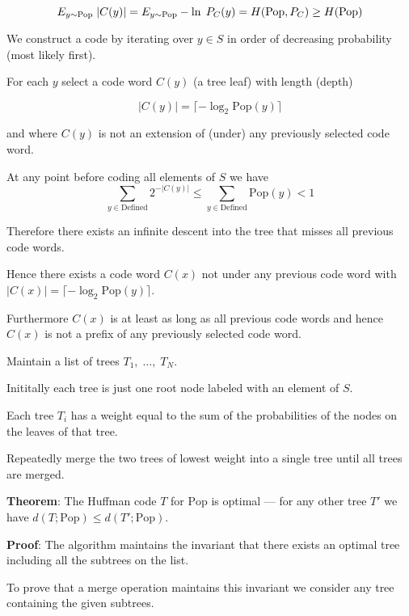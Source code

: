 {$$E_{y \sim \mathrm{Pop}}\;|C(y)| = E_{y \sim \mathrm{Pop}} -\ln \;P_C(y) = H(\mathrm{Pop},P_C) \geq H(\mathrm{Pop})$$


\vfill
We construct a code by iterating over $y \in S$ in order of decreasing probability (most likely first).

\vfill
For each $y$ select a code word $C(y)$ (a tree leaf) with length (depth)

\vfill
$$|C(y)| = \lceil - \log_2 \mathrm{Pop}(y)\rceil$$

\vfill
and where $C(y)$ is not an extension of (under) any previously selected code word.


At any point before coding all elements of $S$ we have
$$\sum_{y \in \mathrm{Defined}} 2^{-|C(y)|} \leq \sum_{y \in \mathrm{Defined}} \mathrm{Pop}(y) < 1$$

\vfill
Therefore there exists an infinite descent into the tree that misses all previous code words.

\vfill
Hence there exists a code word $C(x)$ not under any previous code word with
$|C(x)| = \lceil - \log_2 \mathrm{Pop}(y)\rceil$.

\vfill
Furthermore $C(x)$ is at least as long as all previous code words and hence $C(x)$ is not a prefix of any previously selected code word.


Maintain a list of trees $T_1,\;\dots,\;T_N$.

\vfill
Inititally each tree is just one root node labeled with an element of $S$.

\vfill
Each tree $T_i$ has a weight equal to the sum of the probabilities of the nodes on the leaves of that tree.

\vfill
Repeatedly merge the two trees of lowest weight into a single tree until all trees are merged.


{\bf Theorem}: The Huffman code $T$ for $\mathrm{Pop}$ is optimal --- for any other tree $T'$ we have $d(T;\mathrm{Pop}) \leq d(T';\mathrm{Pop})$.

\vfill
{\bf Proof}: The algorithm maintains the invariant that there exists an optimal tree including
all the subtrees on the list.

\vfill
To prove that a merge operation maintains this invariant we consider any tree containing the given subtrees.

}
